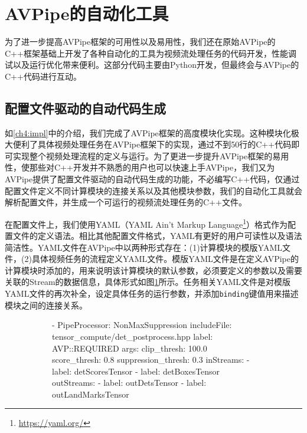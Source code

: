 \section{AVPipe的自动化工具}
为了进一步提高AVPipe框架的可用性以及易用性，我们还在原始AVPipe的C++框架基础上开发了各种自动化的工具为视频流处理任务的代码开发，性能调试以及运行优化带来便利。这部分代码主要由Python开发，但最终会与AVPipe的C++代码进行互动。
\subsection{配置文件驱动的自动代码生成}\label{ch4:auto_codegen}
如\ref{ch4:impl}中的介绍，我们完成了AVPipe框架的高度模块化实现。这种模块化极大便利了具体视频处理任务在AVPipe框架下的实现，通过不到50行的C++代码即可实现整个视频处理流程的定义与运行。为了更进一步提升AVPipe框架的易用性，使那些对C++开发并不熟悉的用户也可以快速上手AVPipe，我们又为AVPipe提供了配置文件驱动的自动代码生成的功能，不必编写C++代码，仅通过配置文件定义不同计算模块的连接关系以及其他模块参数，我们的自动化工具就会解析配置文件，并生成一个可运行的视频流处理任务的C++文件。\par
在配置文件上，我们使用YAML（YAML Ain't Markup Language\footnote{\url{https://yaml.org/}}）格式作为配置文件的定义语法。相比其他配置文件格式，YAML有更好的用户可读性以及语法简洁性。YAML文件在AVPipe中以两种形式存在：(1)计算模块的模版YAML文件，(2)具体视频任务的流程定义YAML文件。模版YAML文件是在定义AVPipe的计算模块时添加的，用来说明该计算模块的默认参数，必须要定义的参数以及需要关联的Stream的数据信息，具体形式如图\ref{fig:yaml}所示。任务相关YAML文件是对模版YAML文件的再次补全，设定具体任务的运行参数，并添加\texttt{binding}键值用来描述模块之间的连接关系。\par

\begin{figure}[!htp]
  \centering
  \begin{subfigure}{0.7\textwidth}
    \centering
    
\begin{codeblock}[language=Ruby, basicstyle=\ttfamily\small]
- PipeProcessor: NonMaxSuppression
  includeFile: tensor_compute/det_postprocess.hpp
  label: AVP::REQUIRED
  args:
    clip_thresh: 100.0
    score_thresh: 0.8
    suppression_thresh: 0.3
  inStreams:
  - label: detScoresTensor
  - label: detBoxesTensor
  outStreams:
  - label: outDetsTensor
  - label: outLandMarksTensor
\end{codeblock}
  \end{subfigure}
  
  \label{fig:yaml}
\end{figure}

